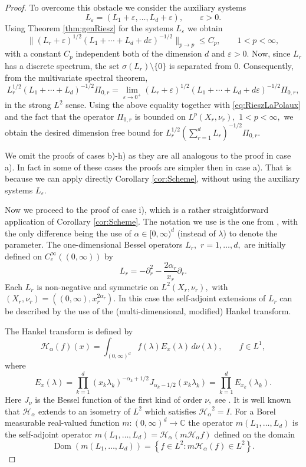 \documentclass[leqno,12pt]{amsart}
\theoremstyle{definition}
\theoremstyle{remark}
\begin{document}
\begin{proof}
To overcome this obstacle we consider the auxiliary systems $$L_{\varepsilon}=(L_1+\varepsilon,\ldots,L_d+\varepsilon),\qquad \varepsilon>0.$$ Using Theorem \ref{thm:genRiesz} for the systems $L_{\varepsilon}$ we obtain
\begin{equation}
\label{eq:RieszLaPolaux}
\|(L_r+\varepsilon)^{1/2}(L_1+\cdots+L_d+d\varepsilon)^{-1/2}\|_{p\to p}\leq C_{p}, \qquad 1<p<\infty,
\end{equation}
with a constant $C_p$ independent both of the dimension $d$ and $\varepsilon>0.$ Now, since $L_r$ has a discrete spectrum, the set $\sigma(L_r)\setminus\{0\}$ is separated from $0.$ Consequently, from the multivariate spectral theorem,
\begin{equation}\label{eq:RieszHelimit}L_r^{1/2}(L_1+\cdots +L_d)^{-1/2}\Pi_{0,r}=\lim_{\varepsilon\to 0^+}(L_r+\varepsilon)^{1/2}(L_1+\cdots+L_d+d\varepsilon)^{-1/2}\Pi_{0,r},\end{equation}
in the strong $L^2$ sense. Using the above equality together with \eqref{eq:RieszLaPolaux} and the fact that the operator $\Pi_{0,r}$ is bounded on $L^p(X_r,\nu_r),$ $1<p<\infty,$ we obtain the desired dimension free bound for $L_r^{1/2}(\sum_{r=1}^d L_r)^{-1/2}\Pi_{0,r}.$

We omit the proofs of cases b)-h) as they are all analogous to the proof in case a). In fact in some of these cases the proofs are simpler then in case a). That is because we can apply directly Corollary \ref{cor:Scheme}, without using the auxiliary systems $L_{\varepsilon}.$

Now we proceed to the proof of case i), which is a rather straightforward application of Corollary \ref{cor:Scheme}. The notation we use is the one from \cite{Bet1}, with the only difference being the use of $\alpha\in[0,\infty)^d$ (instead of ${\lambda}$) to denote the parameter. The one-dimensional Bessel operators $L_r,$ $r=1,\ldots,d,$ are initially defined on $C_c^{\infty}((0,\infty))$ by $$ L_r=-\partial_r^2-\frac{2\alpha_r}{x_r}\partial_r.$$ Each $L_r$ is non-negative and symmetric on $L^2(X_r,\nu_r),$ with $(X_r,\nu_r)=((0,\infty),x_r^{2\alpha_r}).$ In this case the self-adjoint extensions of $L_r$ can be described by the use of the (multi-dimensional, modified) Hankel transform.

The Hankel transform is defined by
\begin{equation*}
{\mathcal{H}_{\alpha}} (f)(x)=\int_{(0,\infty)^d} f({\lambda}) E_{x}({\lambda})\,d\nu({\lambda}), \qquad f\in L^1,
\end{equation*}
where $$E_{x}({\lambda})=\prod_{k=1}^d (x_k {\lambda}_k)^{-\alpha_k+1/2}J_{\alpha_k-1/2}(x_k {\lambda}_k)=\prod_{k=1}^dE_{x_k}({\lambda}_k).$$ Here $J_{\nu}$ is the Bessel function of the first kind of order $\nu,$ see \cite[Chapter 5]{Leb}.
It is well known that ${\mathcal{H}_{\alpha}}$ extends to an isometry of $L^2$ which satisfies ${\mathcal{H}_{\alpha}}^2=I.$ For a Borel measurable real-valued function $m:(0,\infty)^d\to \mathbb{C}$ the operator $m(L_1,\ldots,L_d)$ is the self-adjoint operator $m(L_1,\ldots,L_d)={\mathcal{H}_{\alpha}}(m{\mathcal{H}_{\alpha}} f)$ defined on the domain $$\operatorname{Dom}(m(L_1,\ldots,L_d))=\left\{f\in L^2\colon m{\mathcal{H}_{\alpha}}(f)\in L^2\right\}.$$


\end{proof}
\end{document}
